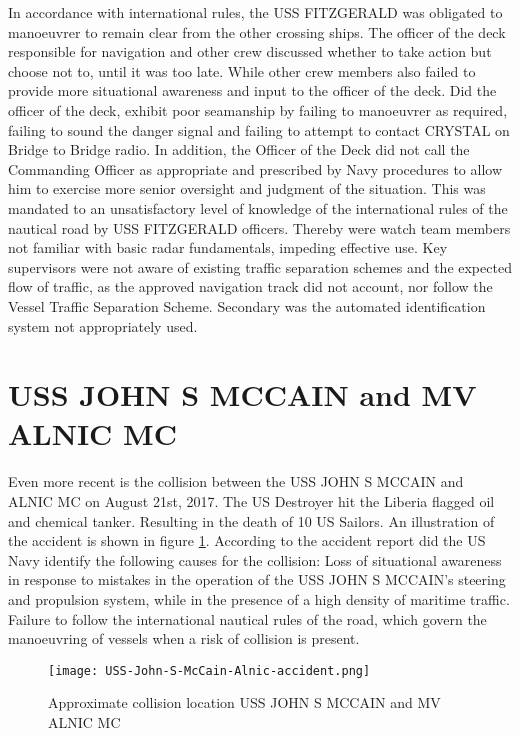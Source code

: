 In accordance with international rules, the USS FITZGERALD was obligated to manoeuvrer to remain clear from the other crossing ships. The officer of the deck responsible for navigation and other crew discussed whether to take action but choose not to, until it was too late. While other crew members also failed to provide more situational awareness and input to the officer of the deck. Did the officer of the deck, exhibit poor seamanship by failing to manoeuvrer as required, failing to sound the danger signal and failing to attempt to contact CRYSTAL on Bridge to Bridge radio. In addition, the Officer of the Deck did not call the Commanding Officer as appropriate and prescribed by Navy procedures to allow him to exercise more senior oversight and judgment of the situation. This was mandated to an unsatisfactory level of knowledge of the international rules of the nautical road by USS FITZGERALD officers. Thereby were watch team members not familiar with basic radar fundamentals, impeding effective use. Key supervisors were not aware of existing traffic separation schemes and the expected flow of traffic, as the approved navigation track did not account, nor follow the Vessel Traffic Separation Scheme. Secondary was the automated identification system not appropriately used. \cite{USNavy2017}

\newpage
\section{USS JOHN S MCCAIN and MV ALNIC MC}
Even more recent is the collision between the USS JOHN S MCCAIN and ALNIC MC on August 21st, 2017. The US Destroyer hit the Liberia flagged oil and chemical tanker. Resulting in the death of 10  US Sailors. An illustration of the accident is shown in figure \ref{fig:Accident-USS-John-S-McCain-Alnic}. According to the accident report did the US Navy identify the following causes for the collision: Loss of situational awareness in response to mistakes in the operation of the USS JOHN S MCCAIN's steering and propulsion system, while in the presence of a high density of maritime traffic. Failure to follow the international nautical rules of the road, which govern the manoeuvring of vessels when a risk of collision is present.

\begin{figure}[p]
	\centering
	\texttt{[image: USS-John-S-McCain-Alnic-accident.png]}
	\caption{Approximate collision location USS JOHN S MCCAIN and MV ALNIC MC}
	\label{fig:Accident-USS-John-S-McCain-Alnic}
\end{figure}

